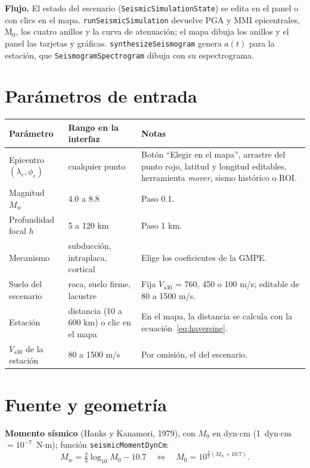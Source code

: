 \documentclass[11pt,a4paper]{article}
\begin{document}
\textbf{Flujo.} El estado del escenario (\texttt{SeismicSimulationState}) se edita en el panel o con
clics en el mapa. \texttt{runSeismicSimulation} devuelve PGA y MMI epicentrales, M$_0$, los cuatro
anillos y la curva de atenuación; el mapa dibuja los anillos y el panel las tarjetas y gráficas.
\texttt{synthesizeSeismogram} genera $a(t)$ para la estación, que \texttt{SeismogramSpectrogram} dibuja
con su espectrograma.

\section{Parámetros de entrada}

\begin{longtable}{>{\raggedright}p{4.2cm} p{3.6cm} p{7.2cm}}
\toprule
Parámetro & Rango en la interfaz & Notas \\
\midrule
\endhead
Epicentro $(\lambda_e,\phi_e)$ & cualquier punto & Botón ``Elegir en el mapa'', arrastre del punto rojo, latitud y longitud editables, herramienta \emph{mover}, sismo histórico o ROI. \\
Magnitud $M_w$ & 4.0 a 8.8 & Paso 0.1. \\
Profundidad focal $h$ & 5 a 120 km & Paso 1 km. \\
Mecanismo & subducción, intraplaca, cortical & Elige los coeficientes de la GMPE. \\
Suelo del escenario & roca, suelo firme, lacustre & Fija $V_{s30}$ = 760, 450 o 100 m/s; editable de 80 a 1500 m/s. \\
Estación & distancia (10 a 600 km) o clic en el mapa & En el mapa, la distancia se calcula con la ecuación~\eqref{eq:haversine}. \\
$V_{s30}$ de la estación & 80 a 1500 m/s & Por omisión, el del escenario. \\
\bottomrule
\end{longtable}

\section{Fuente y geometría}

\textbf{Momento sísmico} (Hanks y Kanamori, 1979), con $M_0$ en dyn$\cdot$cm
(1~dyn$\cdot$cm $=10^{-7}$~N$\cdot$m); función \texttt{seismicMomentDynCm}:
\begin{equation}
  M_w = \tfrac{2}{3}\log_{10} M_0 - 10.7 \quad\Longleftrightarrow\quad M_0 = 10^{\frac{3}{2}(M_w + 10.7)}.
\end{equation}
\end{document}
